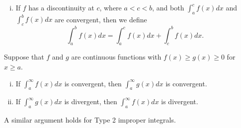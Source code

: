 \documentclass[a4paper,11pt]{article}
\begin{document}
\begin{outline}
\begin{enumerate}[i.]
      \item
        If \(f\) has a discontinuity at \(c\), where \(a < c < b\), and both \(\int_a^cf(x)dx\) and
        \(\int_c^bf(x)dx\) are convergent, then we define \[\int_a^bf(x)dx = \int_a^cf(x)dx + \int_c^bf(x)dx\text{.}\]
    \end{enumerate}
    
    Suppose that \(f\) and \(g\) are continuous functions with \(f(x) \geq g(x) \geq 0\) for \(x \geq a\).
    \begin{enumerate}[i.]
      \item If \(\int_a^{\infty}f(x)dx\) is convergent, then \(\int_a^{\infty}g(x)dx\) is convergent.
      \item If \(\int_a^{\infty}g(x)dx\) is divergent, then \(\int_a^{\infty}f(x)dx\) is divergent.
    \end{enumerate}
    A similar argument holds for Type 2 improper integrals.

\end{outline}
\end{document}

